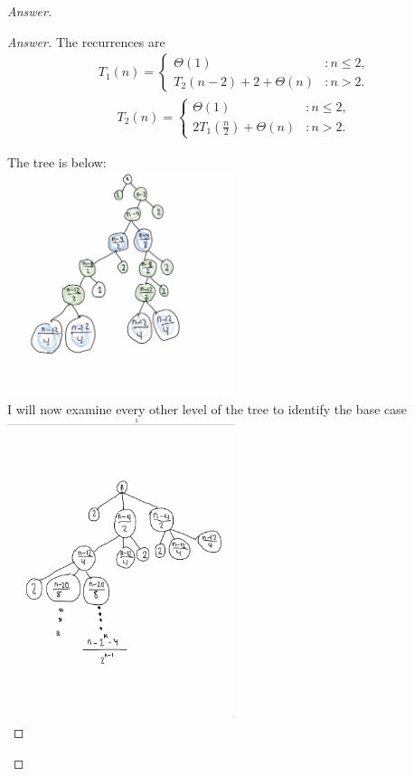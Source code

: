 \documentclass[11pt]{article}
\theoremstyle{definition}
\theoremstyle{definition}
\theoremstyle{definition}
\begin{document}
\begin{proof}[Answer]

\begin{proof}[Answer]
The recurrences are \\
\begin{align*}
T_1(n) = \begin{cases}
\Theta(1) & : n \leq 2, \\
T_2(n-2) + 2+ \Theta(n) & : n > 2.
\end{cases}
\end{align*}
\begin{align*}
T_2(n) = \begin{cases}
\Theta(1) & : n \leq 2, \\
2T_1(\frac{n}{2}) + \Theta(n) & : n > 2.
\end{cases}
\end{align*}

The tree is below: \\
\includegraphics[width=0.5\textwidth]{q17tr} \\

I will now examine every other level of the tree to identify the base case \\
\includegraphics[width=0.5\textwidth]{q172} \\



\end{proof}
\end{proof}
\end{document}
